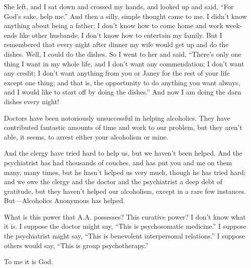 \begin{biblechapter}
\verse She left, and I sat down and crossed my hands, 
    and looked up and said, 
    “For God’s sake, help me.”
\verse And then a silly, simple thought came to me.
\verse I didn’t know anything about being a father; 
    I don’t know how to come home 
    and work week-ends like other husbands; 
    I don’t know how to entertain my family.
\verse But I remembered that every night after dinner 
    my wife would get up and do the dishes.
\verse Well, I could do the dishes.
\verse So I went to her and said, 
    “There’s only one thing I want in my whole life, 
    and I don’t want any commendation; 
    I don’t want any credit; 
    I don’t want anything from you or Janey 
    for the rest of your life except one thing; 
    and that is, the opportunity to do anything you want always, 
    and I would like to start off by doing the dishes.” 
\verse And now I am doing the darn dishes every night!

\verse Doctors have been notoriously unsuccessful in helping alcoholics.
\verse They have contributed 
    fantastic amounts of time and work to our problem, 
    but they aren’t able, it seems, 
    to arrest either your alcoholism or mine.

\verse And the clergy have tried hard to help us, 
    but we haven’t been helped.
\verse And the psychiatrist has had thousands of couches, 
    and has put you and me on them many, many times, 
    but he hasn’t helped us very much, 
    though he has tried hard; 
    and we owe the clergy and the doctor and the psychiatrist 
    a deep debt of gratitude, 
    but they haven’t helped our alcoholism, 
    except in a rare few instances.
\verse But—Alcoholics Anonymous has helped.

\verse What is this power that A.A. possesses?
\verse This curative power?
\verse I don’t know what it is.
\verse I suppose the doctor might say,
    “This is psychosomatic medicine.”
\verse I suppose the psychiatrist might say, 
    “This is benevolent interpersonal relations.”
\verse I suppose others would say, 
    “This is group psychotherapy.”

\verse To me it is God.
\end{biblechapter}
